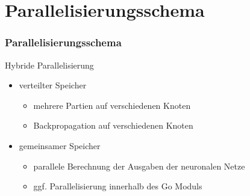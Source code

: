 \documentclass[compress]{beamer}
\begin{document}
\section{Parallelisierungsschema}
\begin{frame}
    \frametitle{Parallelisierungsschema}

    Hybride Parallelisierung
    \begin{itemize}
        \item verteilter Speicher
            \begin{itemize}
                \item mehrere Partien auf verschiedenen Knoten
                \item Backpropagation auf verschiedenen Knoten
            \end{itemize}
        \item gemeinsamer Speicher
            \begin{itemize}
                \item parallele Berechnung der Ausgaben der neuronalen Netze
                \item ggf. Parallelisierung innerhalb des Go Moduls
            \end{itemize}
    \end{itemize}
\end{frame}
\end{document}
